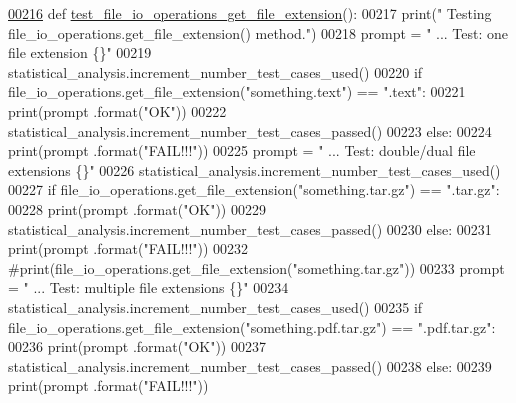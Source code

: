 \begin{DoxyCode}
\hypertarget{classutilities_1_1file__io__tester_1_1file__io__operations__tester_l00216}{}\hyperlink{classutilities_1_1file__io__tester_1_1file__io__operations__tester_a264a387fe5693619617b8b10be1354af}{00216}     \textcolor{keyword}{def }\hyperlink{classutilities_1_1file__io__tester_1_1file__io__operations__tester_a264a387fe5693619617b8b10be1354af}{test\_file\_io\_operations\_get\_file\_extension}():
00217         print(\textcolor{stringliteral}{" Testing file\_io\_operations.get\_file\_extension() method."})
00218         prompt = \textcolor{stringliteral}{"  ... Test: one file extension                \{\}"}
00219         statistical\_analysis.increment\_number\_test\_cases\_used()
00220         \textcolor{keywordflow}{if} file\_io\_operations.get\_file\_extension(\textcolor{stringliteral}{"something.text"}) == \textcolor{stringliteral}{".text"}:
00221             print(prompt .format(\textcolor{stringliteral}{"OK"}))
00222             statistical\_analysis.increment\_number\_test\_cases\_passed()
00223         \textcolor{keywordflow}{else}:
00224             print(prompt .format(\textcolor{stringliteral}{"FAIL!!!"}))
00225         prompt = \textcolor{stringliteral}{"  ... Test: double/dual file extensions           \{\}"}
00226         statistical\_analysis.increment\_number\_test\_cases\_used()
00227         \textcolor{keywordflow}{if} file\_io\_operations.get\_file\_extension(\textcolor{stringliteral}{"something.tar.gz"}) == \textcolor{stringliteral}{".tar.gz"}:
00228             print(prompt .format(\textcolor{stringliteral}{"OK"}))
00229             statistical\_analysis.increment\_number\_test\_cases\_passed()
00230         \textcolor{keywordflow}{else}:
00231             print(prompt .format(\textcolor{stringliteral}{"FAIL!!!"}))
00232             \textcolor{comment}{#print(file\_io\_operations.get\_file\_extension("something.tar.gz"))}
00233         prompt = \textcolor{stringliteral}{"  ... Test: multiple file extensions          \{\}"}
00234         statistical\_analysis.increment\_number\_test\_cases\_used()
00235         \textcolor{keywordflow}{if} file\_io\_operations.get\_file\_extension(\textcolor{stringliteral}{"something.pdf.tar.gz"}) == \textcolor{stringliteral}{".pdf.tar.gz"}:
00236             print(prompt .format(\textcolor{stringliteral}{"OK"}))
00237             statistical\_analysis.increment\_number\_test\_cases\_passed()
00238         \textcolor{keywordflow}{else}:
00239             print(prompt .format(\textcolor{stringliteral}{"FAIL!!!"}))
\end{DoxyCode}

